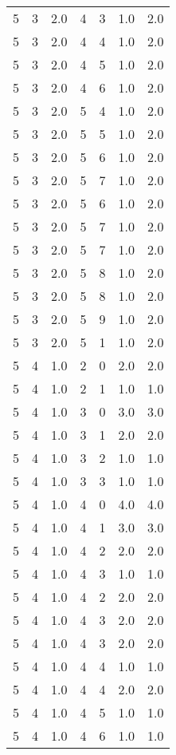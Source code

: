 \documentclass[a4paper,12pt]{article}
\begin{document}
\begin{center}
\begin{longtable}{ c c c | c c c | c }
        5 & 3 & 2.0 & 4 & 3 & 1.0 & 2.0 \\
        5 & 3 & 2.0 & 4 & 4 & 1.0 & 2.0 \\
        5 & 3 & 2.0 & 4 & 5 & 1.0 & 2.0 \\
        5 & 3 & 2.0 & 4 & 6 & 1.0 & 2.0 \\
        5 & 3 & 2.0 & 5 & 4 & 1.0 & 2.0 \\
        5 & 3 & 2.0 & 5 & 5 & 1.0 & 2.0 \\
        5 & 3 & 2.0 & 5 & 6 & 1.0 & 2.0 \\
        5 & 3 & 2.0 & 5 & 7 & 1.0 & 2.0 \\
        5 & 3 & 2.0 & 5 & 6 & 1.0 & 2.0 \\
        5 & 3 & 2.0 & 5 & 7 & 1.0 & 2.0 \\
        5 & 3 & 2.0 & 5 & 7 & 1.0 & 2.0 \\
        5 & 3 & 2.0 & 5 & 8 & 1.0 & 2.0 \\
        5 & 3 & 2.0 & 5 & 8 & 1.0 & 2.0 \\
        5 & 3 & 2.0 & 5 & 9 & 1.0 & 2.0 \\
        5 & 3 & 2.0 & 5 & 1 & 1.0 & 2.0 \\
        5 & 4 & 1.0 & 2 & 0 & 2.0 & 2.0 \\
        5 & 4 & 1.0 & 2 & 1 & 1.0 & 1.0 \\
        5 & 4 & 1.0 & 3 & 0 & 3.0 & 3.0 \\
        5 & 4 & 1.0 & 3 & 1 & 2.0 & 2.0 \\
        5 & 4 & 1.0 & 3 & 2 & 1.0 & 1.0 \\
        5 & 4 & 1.0 & 3 & 3 & 1.0 & 1.0 \\
        5 & 4 & 1.0 & 4 & 0 & 4.0 & 4.0 \\
        5 & 4 & 1.0 & 4 & 1 & 3.0 & 3.0 \\
        5 & 4 & 1.0 & 4 & 2 & 2.0 & 2.0 \\
        5 & 4 & 1.0 & 4 & 3 & 1.0 & 1.0 \\
        5 & 4 & 1.0 & 4 & 2 & 2.0 & 2.0 \\
        5 & 4 & 1.0 & 4 & 3 & 2.0 & 2.0 \\
        5 & 4 & 1.0 & 4 & 3 & 2.0 & 2.0 \\
        5 & 4 & 1.0 & 4 & 4 & 1.0 & 1.0 \\
        5 & 4 & 1.0 & 4 & 4 & 2.0 & 2.0 \\
        5 & 4 & 1.0 & 4 & 5 & 1.0 & 1.0 \\
        5 & 4 & 1.0 & 4 & 6 & 1.0 & 1.0 \\

\end{longtable}
\end{center}
\end{document}
